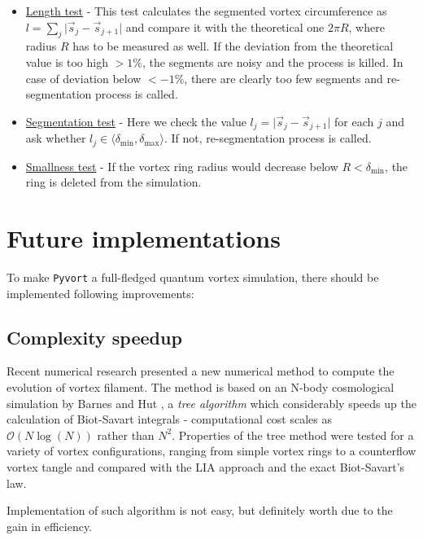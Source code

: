 \begin{itemize}
	\item \underline{Length test} - This test calculates the segmented vortex circumference as $l = \sum_j \vert \vec{s}_j - \vec{s}_{j+1} \vert$ and compare it with the theoretical one $2\pi R$, where radius $R$ has to be measured as well. If the deviation from the theoretical value is too high $>1\%$, the segments are noisy and the process is killed. In case of deviation below $<-1\%$, there are clearly too few segments and re-segmentation process is called.

	\item \underline{Segmentation test} - Here we check the value $l_j = \vert \vec{s}_j - \vec{s}_{j+1} \vert$ for each $j$ and ask whether $l_j \in \langle \delta_{\text{min}}, \delta_{\text{max}} \rangle$. If not, re-segmentation process is called.

	\item \underline{Smallness test} - If the vortex ring radius would decrease below $R < \delta_{\text{min}}$, the ring is deleted from the simulation.
\end{itemize}

\section{Future implementations}

To make \texttt{Pyvort} a full-fledged quantum vortex simulation, there should be implemented following improvements:

\subsection*{Complexity speedup}

Recent numerical research presented \cite{tree_alg} a new numerical method to compute the evolution of vortex filament. The method is based on an N-body cosmological simulation by Barnes and Hut \cite{barnes}, a \textit{tree algorithm} which considerably speeds up the calculation of Biot-Savart integrals - computational cost scales as $\mathcal{O}(N \log(N))$ rather than $N^2$. Properties of the tree method were tested for a variety of vortex configurations, ranging from simple vortex rings to a counterflow vortex tangle and compared with the LIA approach and the exact Biot-Savart's law.

Implementation of such algorithm is not easy, but definitely worth due to the gain in efficiency.


